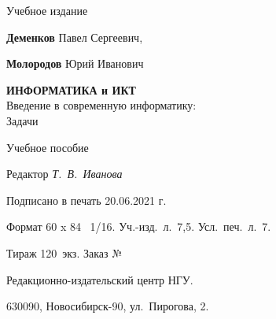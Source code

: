 \thispagestyle{empty}

\begin{center}

Учебное издание

\vspace*{23mm}

{\bf Деменков} Павел Сергеевич,

\vspace{5mm}

{\bf Молородов} Юрий Иванович

\vspace{25mm}


{\large \bf ИНФОРМАТИКА и ИКТ}\\
{\large Введение в современную информатику: \\Задачи}

\vspace*{0.5cm}

Учебное пособие\\

\vspace*{40mm}

Редактор {\it Т.~В.~Иванова}

\vspace {1cm}

{\small
Подписано в печать {20.06.2021 г.}

Формат 60 x 84 \ 1/16. Уч.-изд.~л.~7,5. Усл.~печ.~л.~7.

\vspace{5mm}
Тираж 120~экз. Заказ № \hspace*{8mm}
\vspace{5mm}

Редакционно-издательский центр НГУ.

630090, Новосибирск-90, ул.~Пирогова, 2.}

\end{center}

